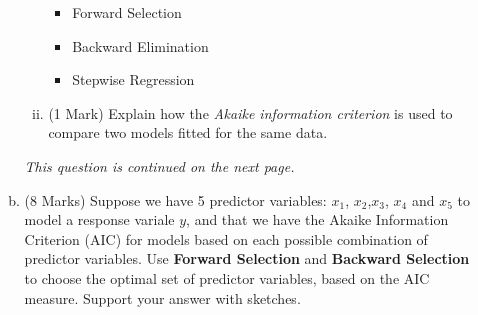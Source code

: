 \begin{enumerate}
\begin{enumerate}[(a)]
\begin{enumerate}[(i)]
\begin{itemize}
		\item Forward Selection
		\item Backward Elimination
		\item Stepwise Regression
\end{itemize}
\item (1 Mark)  Explain how the \emph{Akaike information criterion} is used to compare two models fitted for the same data.
\end{enumerate}
\noindent \textit{This question is continued on the next page.}
\newpage
\item (8 Marks) Suppose we have 5 predictor variables: $x_1$, $x_2$,$x_3$, $x_4$ and $x_5$ to model a response variale $y$, and that we have the Akaike Information Criterion (AIC) for models based on each possible combination of predictor variables.
Use \textbf{Forward Selection} and \textbf{Backward Selection} to choose the optimal set of predictor variables, based on the AIC measure.
Support your answer with sketches.

\end{enumerate}
\end{enumerate}






